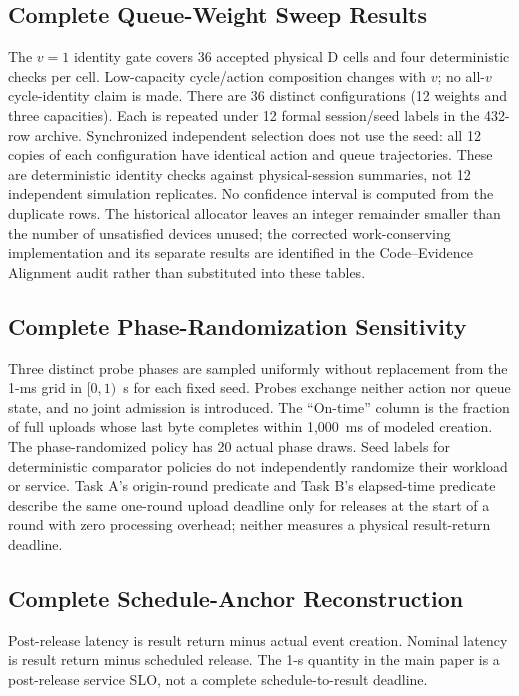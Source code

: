 \documentclass[10pt,onecolumn]{IEEEtran}
\begin{document}
\begin{landscape}
\section{Complete Queue-Weight Sweep Results}
The $v=1$ identity gate covers 36 accepted physical D cells and four deterministic checks per cell. Low-capacity cycle/action composition changes with $v$; no all-$v$ cycle-identity claim is made.
There are 36 distinct configurations (12 weights and three capacities).
Each is repeated under 12 formal session/seed labels in the 432-row archive.
Synchronized independent selection does not use the seed: all 12 copies of
each configuration have identical action and queue trajectories. These are
deterministic identity checks against physical-session summaries, not 12
independent simulation replicates. No confidence interval is computed from
the duplicate rows. The historical allocator leaves an integer remainder
smaller than the number of unsatisfied devices unused; the corrected
work-conserving implementation and its separate results are identified in
the Code--Evidence Alignment audit rather than substituted into these tables.
\scriptsize\end{landscape}

\begin{landscape}
\section{Complete Phase-Randomization Sensitivity}
Three distinct probe phases are sampled uniformly without replacement from
the 1-ms grid in $[0,1)$~s for each fixed seed. Probes exchange neither action
nor queue state, and no joint admission is introduced.
The ``On-time'' column is the fraction of full uploads whose last byte
completes within 1,000~ms of modeled creation. The phase-randomized policy
has 20 actual phase draws. Seed labels for deterministic comparator policies
do not independently randomize their workload or service. Task A's
origin-round predicate and Task B's elapsed-time predicate describe the same
one-round upload deadline only for releases at the start of a round with
zero processing overhead; neither measures a physical result-return deadline.
\scriptsize\end{landscape}

\begin{landscape}
\section{Complete Schedule-Anchor Reconstruction}
Post-release latency is result return minus actual event creation. Nominal latency is result return minus scheduled release. The 1-s quantity in the main paper is a post-release service SLO, not a complete schedule-to-result deadline.
\tiny\end{landscape}
\end{document}
